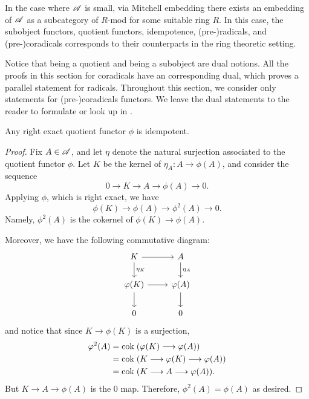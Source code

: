 \begin{rmk}
In the case where $\mathscr{A}$ is small, via Mitchell embedding 
there exists an embedding of $\mathscr{A}$ as a subcategory of $R$-mod
for some suitable ring $R$. In this case, the subobject functors, 
quotient functors, idempotence, (pre-)radicals, and 
(pre-)coradicals corresponds to their counterparts in the ring 
theoretic setting.
\end{rmk}

\begin{rmk}
Notice that being a quotient and being a subobject are dual 
notions. All the proofs in this section for coradicals have an 
corresponding dual, which proves a parallel statement for radicals.
Throughout this section, we consider only statements for 
(pre-)coradicals functors. We leave the dual statements to the 
reader to formulate or look up in \cite{DTor}.
\end{rmk}

\begin{prop}
Any right exact quotient functor $\phi$ is idempotent. 
\end{prop}
\begin{proof}
Fix $A \in \mathscr{A}$, and let $\eta$ denote the natural surjection 
associated to the quotient functor $\phi$. Let $K$ be the kernel 
of $\eta_A: A \to \phi(A)$, and consider the sequence
\[
0 \to K \to A \to \phi(A) \to 0.
\]
Applying $\phi$, which is right exact, we have
\[
\phi(K) \to \phi(A) \to \phi^2(A) \to 0.
\]
Namely, $\phi^2(A)$ is the cokernel of $\phi(K) \to \phi(A)$.

Moreover, we have the following commutative diagram:
\[
\begin{tikzcd}
K \arrow{r} \arrow{d}{\eta_K} &
A \arrow{d}{\eta_A} \\
\phi(K) \arrow{r} \arrow{d} &
\phi(A) \arrow{d} \\
0 & 0
\end{tikzcd}
\]
and notice that since $K \to \phi(K)$ is a surjection,
\begin{align*}
\varphi^2(A) &= \mathrm{cok}\; (\varphi(K) \longrightarrow \varphi(A)) \\
          &= \mathrm{cok}\; (K \longrightarrow \varphi(K) \longrightarrow \varphi(A)) \\
          &= \mathrm{cok}\; (K \longrightarrow A \longrightarrow \varphi(A)).
\end{align*}
But $K \to A \to \phi(A)$ is the $0$ map. Therefore, $\phi^2(A) = 
\phi(A)$ as desired.
\end{proof}

